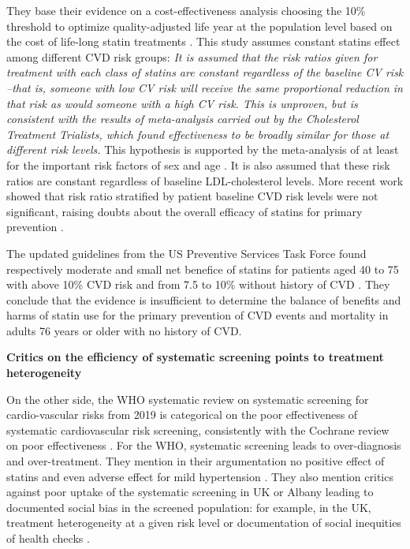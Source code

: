 \documentclass[10pt,letterpaper]{article}
\begin{document}
They base their evidence on a cost-effectiveness analysis choosing the 10\%
threshold to optimize quality-adjusted life year at the population level based
on the cost of life-long statin treatments \cite{guthrie2023competing}. This
study assumes constant statins effect among different CVD risk groups:
\emph{It is assumed that the risk ratios given for treatment with each class
  of statins are constant regardless of the baseline CV risk --that is, someone
  with low CV risk will receive the same proportional reduction in that risk as
  would someone with a high CV risk. This is unproven, but is consistent with
  the results of meta-analysis carried out by the Cholesterol Treatment
  Trialists, which found effectiveness to be broadly similar for those at
  different risk levels.} This hypothesis is supported by the meta-analysis of
 at least for the important risk factors of sex and age \cite{brugts2009benefits}. It is also assumed that these risk ratios are constant regardless of
baseline LDL-cholesterol levels. More recent work showed that risk ratio
stratified by patient baseline CVD risk levels were not significant, raising
doubts about the overall efficacy of statins for primary prevention \cite{byrne2019statins}.

The updated guidelines from the US Preventive Services Task Force found
respectively moderate and small net benefice of statins for patients aged 40
to 75 with above 10\% CVD risk and from 7.5 to 10\% without history of CVD
\cite{chou2022statin}. They conclude that the evidence is insufficient to
determine the balance of benefits and harms of statin use for the primary
prevention of CVD events and mortality in adults 76 years or older with no
history of CVD.


\textbf{Critics on the efficiency of systematic screening points to treatment heterogeneity}

On the other side, the WHO systematic review on systematic screening for
cardio-vascular risks from 2019 \cite{eriksen2021effectiveness} is
categorical on the poor effectiveness of systematic cardiovascular risk
screening, consistently with the Cochrane review on poor effectiveness
\cite{krogsboll2012general}. For the WHO, systematic screening leads to
over-diagnosis and over-treatment. They mention in their argumentation no
positive effect of statins and even adverse effect for mild hypertension
\cite{diao2012pharmacotherapy}. They also mention critics against poor
uptake of the systematic screening in UK or Albany leading to documented
social bias in the screened population: for example, in the UK, treatment
heterogeneity at a given risk level \cite{van2013efficiency} or documentation
of social inequities of health checks \cite{krska2016implementation}.
\end{document}
